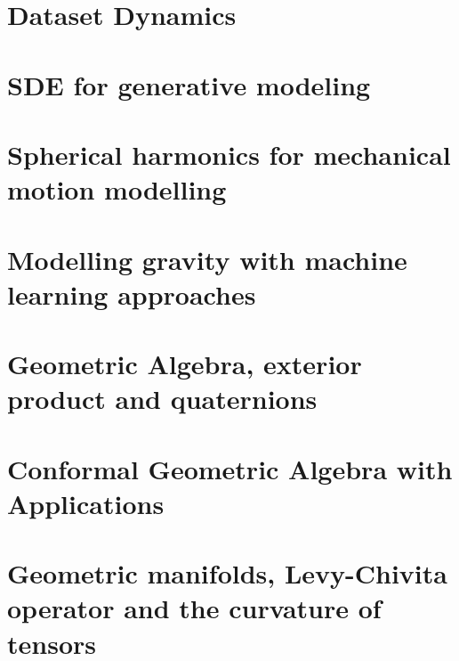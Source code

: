 \documentclass{mybook}
\begin{document}
    \clearpage
    \chapter{Dataset Dynamics}
    

    \clearpage
    \chapter{SDE for generative modeling}
    
    
    \clearpage
    \chapter{Spherical harmonics for mechanical motion modelling}
    
    
    \clearpage
    \chapter{Modelling gravity with machine learning approaches}
    
    
    \clearpage
    \chapter{Geometric Algebra, exterior product and quaternions}
    
    
    \clearpage
    \chapter{Conformal Geometric Algebra with Applications}
    
    
    \clearpage
    \chapter{ Geometric manifolds, Levy-Chivita operator and the curvature of tensors}
    

    \clearpage
    \printbibliography
\end{document}
